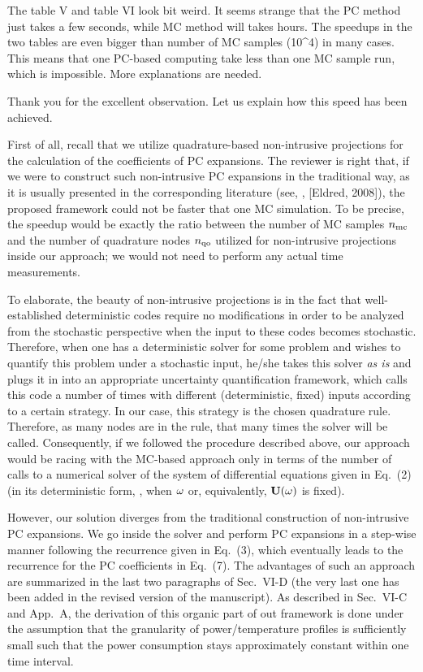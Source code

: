 \begin{reviewer}
The table V and table VI look  bit weird.  It seems strange that the PC method just takes a few seconds, while MC method will takes hours. The speedups in the two tables  are even bigger than number of MC samples (10\^{}4) in many cases. This means that one PC-based computing take less than one MC sample run, which is impossible.  More explanations are needed.
\end{reviewer}
\begin{authors}
Thank you for the excellent observation.
Let us explain how this speed has been achieved.

First of all, recall that we utilize quadrature-based non-intrusive projections for the calculation of the coefficients of PC expansions.
The reviewer is right that, if we were to construct such non-intrusive PC expansions in the traditional way, as it is usually presented in the corresponding literature (see, \eg, [Eldred, 2008]), the proposed framework could not be faster that one MC simulation.
To be precise, the speedup would be exactly the ratio between the number of MC samples ${n_\text{mc}}$ and the number of quadrature nodes ${n_\text{qo}}$ utilized for non-intrusive projections inside our approach; we would not need to perform any actual time measurements.

To elaborate, the beauty of non-intrusive projections is in the fact that well-established deterministic codes require no modifications in order to be analyzed from the stochastic perspective when the input to these codes becomes stochastic.
Therefore, when one has a deterministic solver for some problem and wishes to quantify this problem under a stochastic input, he/she takes this solver \emph{as is} and plugs it in into an appropriate uncertainty quantification framework, which calls this code a number of times with different (deterministic, fixed) inputs according to a certain strategy.
In our case, this strategy is the chosen quadrature rule.
Therefore, as many nodes are in the rule, that many times the solver will be called.
Consequently, if we followed the procedure described above, our approach would be racing with the MC-based approach only in terms of the number of calls to a numerical solver of the system of differential equations given in Eq.~(2) (in its deterministic form, \ie, when $\omega$ or, equivalently, $\mathbf{U}(\omega)$ is fixed).

However, our solution diverges from the traditional construction of non-intrusive PC expansions.
We go inside the solver and perform PC expansions in a step-wise manner following the recurrence given in Eq.~(3), which eventually leads to the recurrence for the PC coefficients in Eq.~(7).
The advantages of such an approach are summarized in the last two paragraphs of Sec.~VI-D (the very last one has been added in the revised version of the manuscript).
As described in Sec.~VI-C and App.~A, the derivation of this organic part of out framework is done under the assumption that the granularity of power/temperature profiles is sufficiently small such that the power consumption stays approximately constant within one time interval.


\end{authors}
